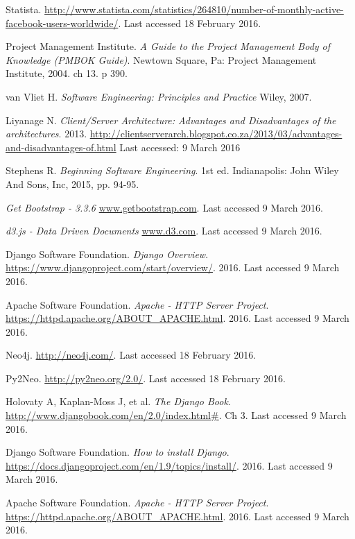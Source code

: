 \documentclass[12pt,onecolumn]{article}
\begin{document}
	
	\begin{thebibliography}{1}
		 Statista. \url {http://www.statista.com/statistics/264810/number-of-monthly-active-facebook-users-worldwide/}. Last accessed 18 February 2016. 
		
		 Project Management Institute. \emph{A Guide to the Project Management Body of Knowledge (PMBOK Guide)}. Newtown Square, Pa: Project Management Institute, 2004. ch 13. p 390.
		
		 van Vliet H. \emph{Software Engineering: Principles and Practice} Wiley, 2007.
		
		 Liyanage N. \emph{Client/Server Architecture: Advantages and Disadvantages of the architectures}. 2013. \url{http://clientserverarch.blogspot.co.za/2013/03/advantages-and-disadvantages-of.html} Last accessed: 9 March 2016
		
		 Stephens R. \emph{Beginning Software Engineering}. 1st ed. Indianapolis: John Wiley And Sons, Inc, 2015, pp. 94-95.
		
		  \emph{Get Bootstrap - 3.3.6} \url{www.getbootstrap.com}. Last accessed 9 March 2016.
		
		  \emph{d3.js - Data Driven Documents} \url{www.d3.com}. Last accessed 9 March 2016.
		
		 Django Software Foundation. \emph{Django Overview}. \url{https://www.djangoproject.com/start/overview/}. 2016. Last accessed 9 March 2016.
		
		 Apache Software Foundation. \emph{Apache - HTTP Server Project}. \url{https://httpd.apache.org/ABOUT_APACHE.html}. 2016. Last accessed 9 March 2016.
		
		 Neo4j. \url{http://neo4j.com/}. Last accessed 18 February 2016.
		
		 Py2Neo. \url{http://py2neo.org/2.0/}. Last accessed 18 February 2016.
		
		 Holovaty A, Kaplan-Moss J, et al. \emph{The Django Book}. \url{http://www.djangobook.com/en/2.0/index.html#}. Ch 3. Last accessed 9 March 2016.
		
		 Django Software Foundation. \emph{How to install Django}. \url{https://docs.djangoproject.com/en/1.9/topics/install/}. 2016. Last accessed 9 March 2016.	
		
		 Apache Software Foundation. \emph{Apache - HTTP Server Project}. \url{https://httpd.apache.org/ABOUT_APACHE.html}. 2016. Last accessed 9 March 2016.	
		

\end{thebibliography}
\end{document}

